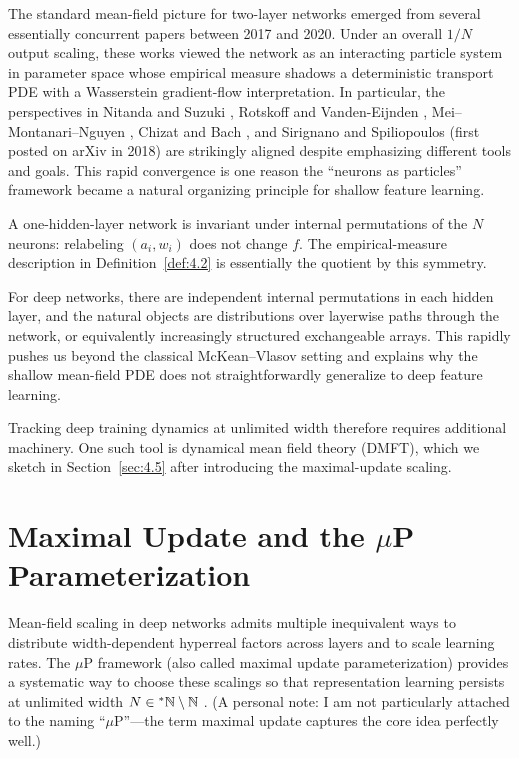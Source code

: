 The standard mean-field picture for two-layer networks emerged from several essentially concurrent papers between 2017 and 2020. Under an overall $1/N$ output scaling, these works viewed the network as an interacting particle system in parameter space whose empirical measure shadows a deterministic transport PDE with a Wasserstein gradient-flow interpretation. In particular, the perspectives in Nitanda and Suzuki \cite{nitanda2017stochastic}, Rotskoff and Vanden-Eijnden \cite{rotskoff2018neural}, Mei--Montanari--Nguyen \cite{mei2018mean}, Chizat and Bach \cite{chizat2018global}, and Sirignano and Spiliopoulos \cite{sirignano2020mean} (first posted on arXiv in 2018) are strikingly aligned despite emphasizing different tools and goals. This rapid convergence is one reason the ``neurons as particles'' framework became a natural organizing principle for shallow feature learning.

\begin{remark}\label{rem:4.5}
A one-hidden-layer network is invariant under internal permutations of the $N$ neurons: relabeling $(a_i, w_i)$ does not change $f$. The empirical-measure description in Definition~\ref{def:4.2} is essentially the quotient by this symmetry.

For deep networks, there are independent internal permutations in each hidden layer, and the natural objects are distributions over layerwise paths through the network, or equivalently increasingly structured exchangeable arrays. This rapidly pushes us beyond the classical McKean--Vlasov setting and explains why the shallow mean-field PDE does not straightforwardly generalize to deep feature learning.
\end{remark}

Tracking deep training dynamics at unlimited width therefore requires additional machinery. One such tool is dynamical mean field theory (DMFT), which we sketch in Section~\ref{sec:4.5} after introducing the maximal-update scaling.

\section{Maximal Update and the \texorpdfstring{$\mu$P}{muP} Parameterization}
\label{sec:4.4}

Mean-field scaling in deep networks admits multiple inequivalent ways to distribute width-dependent hyperreal factors across layers and to scale learning rates. The $\mu$P framework (also called maximal update parameterization) provides a systematic way to choose these scalings so that representation learning persists at unlimited width $N \in {}^*\mathbb{N} \setminus \mathbb{N}$ \cite{yang2021tensor,yang2022tensor}. (A personal note: I am not particularly attached to the naming ``$\mu$P''---the term maximal update captures the core idea perfectly well.)

